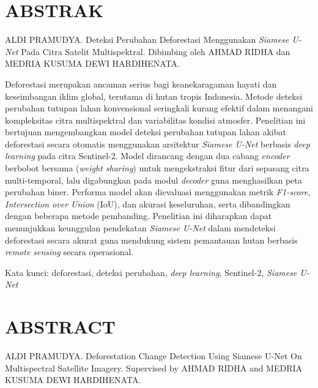 
\chapter*{ABSTRAK}

\noindent
ALDI PRAMUDYA. Deteksi Perubahan Deforestasi Menggunakan \textit{Siamese U-Net} Pada Citra Satelit Multispektral.
Dibimbing oleh AHMAD RIDHA dan MEDRIA KUSUMA DEWI HARDIHENATA.

Deforestasi merupakan ancaman serius bagi keanekaragaman hayati dan keseimbangan iklim global, terutama di hutan tropis Indonesia. Metode deteksi perubahan tutupan lahan konvensional seringkali kurang efektif dalam menangani kompleksitas citra multispektral dan variabilitas kondisi atmosfer. Penelitian ini bertujuan mengembangkan model deteksi perubahan tutupan lahan akibat deforestasi secara otomatis menggunakan arsitektur \textit{Siamese U-Net} berbasis \textit{deep learning} pada citra Sentinel-2. Model dirancang dengan dua cabang \textit{encoder} berbobot bersama (\textit{weight sharing}) untuk mengekstraksi fitur dari sepasang citra multi-temporal, lalu digabungkan pada modul \textit{decoder} guna menghasilkan peta perubahan biner. Performa model akan dievaluasi menggunakan metrik \textit{F1-score}, \textit{Intersection over Union} (IoU), dan akurasi keseluruhan, serta dibandingkan dengan beberapa metode pembanding. Penelitian ini diharapkan dapat menunjukkan keunggulan pendekatan \textit{Siamese U-Net} dalam mendeteksi deforestasi secara akurat guna mendukung sistem pemantauan hutan berbasis \textit{remote sensing} secara operasional.

\vspace{0.3cm}
\noindent
Kata kunci: deforestasi, deteksi perubahan, \textit{deep learning}, Sentinel-2, \textit{Siamese U-Net}

\vspace{1cm}
\begingroup
\let\clearpage\relax
\let\cleardoublepage\relax
\chapter*{ABSTRACT}
\endgroup


\noindent
ALDI PRAMUDYA. Deforestation Change Detection Using Siamese U-Net On Multispectral Satellite Imagery.
Supervised by AHMAD RIDHA and MEDRIA KUSUMA DEWI HARDIHENATA.

